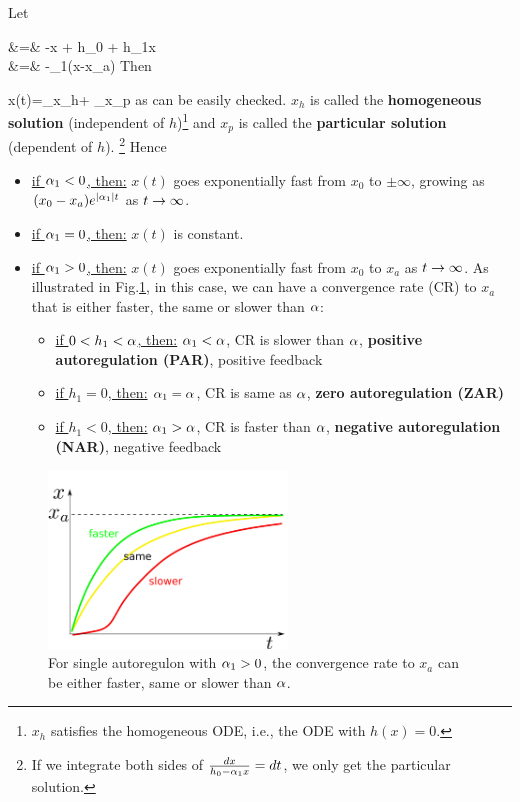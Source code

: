 Let 

\beqa
{} &=& -\alp x + h_0 + h_1x
\\
&=& -\alp_1(x-x_a)
\eeqa
Then 

\beq
x(t)=_{x_h}+
_{x_p}
\eeq
as can be easily checked.
$x_h$ is called the {\bf homogeneous solution} (independent of $h$)\footnote{
$x_h$ satisfies the homogeneous ODE, i.e., the
ODE with $h(x)=0$.
}
and $x_p$ is called the {\bf particular solution} (dependent of $h$).
\footnote{
If we integrate both sides of
$\frac{dx}{h_0 -\alpha_1 x}=dt$,
we only get the particular solution.}
Hence 

\begin{itemize}
\item
\ul{if $\alpha_1<0$, then:} $x(t)$ 
goes exponentially fast  from $x_0$ to $\pm \infty$,
growing as  $(x_0 -x_a)e^{|\alpha_1|t}$
as $t\rightarrow \infty$. 

\item \ul{if $\alpha_1=0$, then:}
$x(t)$ is constant. 

\item 
\ul{if $\alpha_1>0$, then:} $x(t)$ goes exponentially fast from
$x_0$ to $x_a$ as $t\rightarrow \infty$.
As illustrated in Fig.\ref{fig-fast-normal-slow}, in
this case,
we can have a convergence rate (CR)
 to $x_a$
 that is either faster, the same or slower than $\alpha$:
\begin{itemize}[$\checkmark$]

\item \ul{if $0<h_1<\alpha$, then:} $\alpha_1<\alpha$, 
CR is slower than $\alpha$, {\bf positive autoregulation (PAR)}, positive feedback

\item \ul{if $h_1=0$, then:} $\alpha_1=\alpha$, CR is same as $\alpha$,
{\bf zero autoregulation (ZAR)}

\item \ul{if $h_1<0$, then:} $\alpha_1>\alpha$, CR is faster than $\alpha$,
{\bf negative autoregulation (NAR)},
negative feedback
\end{itemize}
\end{itemize}


\begin{figure}[h!]
\centering
\includegraphics[width=2.5in]
{autoregulons/fast-normal-slow.png}
\caption{For single autoregulon
with $\alpha_1>0$, the convergence rate to $x_a$ can 
be either faster, same or slower than $\alpha$.
 }
\label{fig-fast-normal-slow}
\end{figure}




